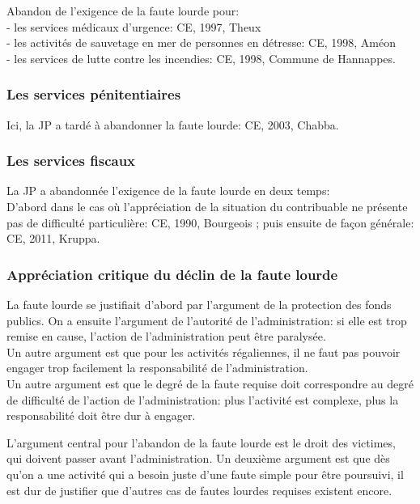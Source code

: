 \documentclass[10pt, a4paper, openany]{book}
\begin{document}
Abandon de l'exigence de la faute lourde pour: \\
- les services médicaux d'urgence: CE, 1997, Theux \\
- les activités de sauvetage en mer de personnes en détresse: CE, 1998, Améon \\
- les services de lutte contre les incendies: CE, 1998, Commune de Hannappes. 

\subsubsection{Les services pénitentiaires}

Ici, la JP a tardé à abandonner la faute lourde: CE, 2003, Chabba. 

\subsubsection{Les services fiscaux}

La JP a abandonnée l'exigence de la faute lourde en deux temps: \\
D'abord dans le cas où l'appréciation de la situation du contribuable ne présente pas de difficulté particulière: CE, 1990, Bourgeois ; puis ensuite de façon générale: CE, 2011, Kruppa. 

\subsubsection{Appréciation critique du déclin de la faute lourde}

La faute lourde se justifiait d'abord par l'argument de la protection des fonds publics. On a ensuite l'argument de l'autorité de l'administration: si elle est trop remise en cause, l'action de l'administration peut être paralysée. \\
Un autre argument est que pour les activités régaliennes, il ne faut pas pouvoir engager trop facilement la responsabilité de l'administration. \\
Un autre argument est que le degré de la faute requise doit correspondre au degré de difficulté de l'action de l'administration: plus l'activité est complexe, plus la responsabilité doit être dur à engager.


L'argument central pour l'abandon de la faute lourde est le droit des victimes, qui doivent passer avant l'administration. Un deuxième argument est que dès qu'on a une activité qui a besoin juste d'une faute simple pour être poursuivi, il est dur de justifier que d'autres cas de fautes lourdes requises existent encore. 
\end{document}
